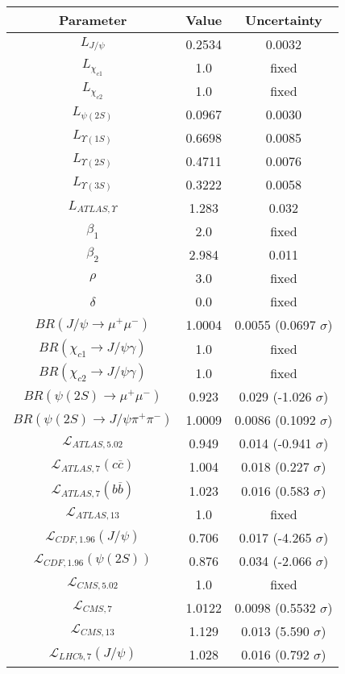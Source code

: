\begin{table}[h!]
\centering
\begin{tabular}{c|c|c}
Parameter & Value & Uncertainty \\
\hline
$L_{J/\psi}$ & 0.2534 & 0.0032 \\
$L_{\chi_{c1}}$ & 1.0 & fixed \\
$L_{\chi_{c2}}$ & 1.0 & fixed \\
$L_{\psi(2S)}$ & 0.0967 & 0.0030 \\
$L_{\Upsilon(1S)}$ & 0.6698 & 0.0085 \\
$L_{\Upsilon(2S)}$ & 0.4711 & 0.0076 \\
$L_{\Upsilon(3S)}$ & 0.3222 & 0.0058 \\
$L_{ATLAS,\Upsilon}$ & 1.283 & 0.032 \\
$\beta_1$ & 2.0 & fixed \\
$\beta_2$ & 2.984 & 0.011 \\
$\rho$ & 3.0 & fixed \\
$\delta$ & 0.0 & fixed \\
$BR(J/\psi\rightarrow\mu^+\mu^-)$ & 1.0004 & 0.0055 (0.0697 $\sigma$) \\
$BR(\chi_{c1}\rightarrow J/\psi\gamma)$ & 1.0 & fixed \\
$BR(\chi_{c2}\rightarrow J/\psi\gamma)$ & 1.0 & fixed \\
$BR(\psi(2S)\rightarrow\mu^+\mu^-)$ & 0.923 & 0.029 (-1.026 $\sigma$) \\
$BR(\psi(2S)\rightarrow J/\psi\pi^+\pi^-)$ & 1.0009 & 0.0086 (0.1092 $\sigma$) \\
$\mathcal L_{ATLAS,5.02}$ & 0.949 & 0.014 (-0.941 $\sigma$) \\
$\mathcal L_{ATLAS,7}(c\overline c)$ & 1.004 & 0.018 (0.227 $\sigma$) \\
$\mathcal L_{ATLAS,7}(b\overline b)$ & 1.023 & 0.016 (0.583 $\sigma$) \\
$\mathcal L_{ATLAS,13}$ & 1.0 & fixed \\
$\mathcal L_{CDF,1.96}(J/\psi)$ & 0.706 & 0.017 (-4.265 $\sigma$) \\
$\mathcal L_{CDF,1.96}(\psi(2S))$ & 0.876 & 0.034 (-2.066 $\sigma$) \\
$\mathcal L_{CMS,5.02}$ & 1.0 & fixed \\
$\mathcal L_{CMS,7}$ & 1.0122 & 0.0098 (0.5532 $\sigma$) \\
$\mathcal L_{CMS,13}$ & 1.129 & 0.013 (5.590 $\sigma$) \\
$\mathcal L_{LHCb,7}(J/\psi)$ & 1.028 & 0.016 (0.792 $\sigma$) \\

\end{tabular}
\end{table}
